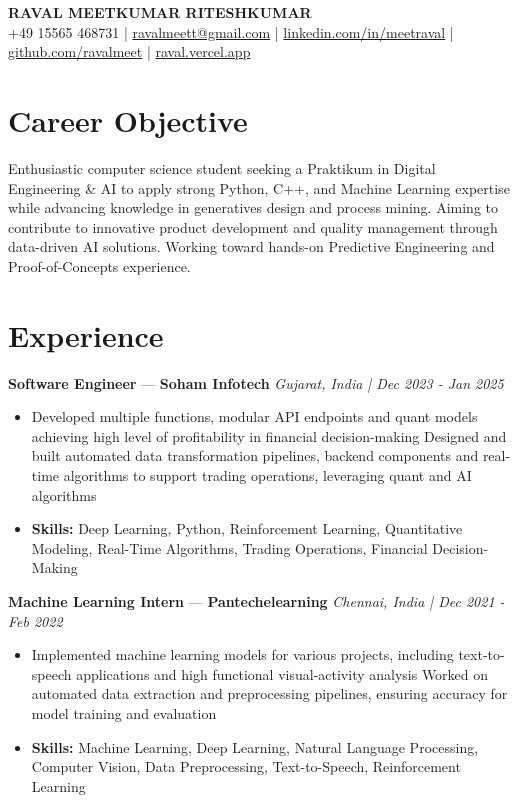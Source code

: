 \documentclass[a4paper,10pt]{article}
\begin{document}
\begin{center}
  {\Large\bfseries RAVAL MEETKUMAR RITESHKUMAR}\\[2pt]
  {\small +49 15565 468731 \;|\; \href{mailto:ravalmeett@gmail.com}{ravalmeett@gmail.com} \;|\; \href{https://www.linkedin.com/in/meetraval/}{linkedin.com/in/meetraval} \;|\; \href{https://github.com/ravalmeet}{github.com/ravalmeet} \;|\; \href{https://raval.vercel.app/}{raval.vercel.app}}
\end{center}
\vspace{-3pt}

\section*{Career Objective}
Enthusiastic computer science student seeking a Praktikum in Digital Engineering \& AI to apply strong Python, C++, and Machine Learning expertise while advancing knowledge in generatives design and process mining. Aiming to contribute to innovative product development and quality management through data-driven AI solutions. Working toward hands-on Predictive Engineering and Proof-of-Concepts experience.\par

\section*{Experience}
\textbf{Software Engineer} — \textbf{Soham Infotech} \hfill \textit{Gujarat, India \;|\; Dec 2023 - Jan 2025}\par
\vspace{1pt}
\begin{itemize}
  \item Developed multiple functions, modular API endpoints and quant models achieving high level of profitability in financial decision-making Designed and built automated data transformation pipelines, backend components and real-time algorithms to support trading operations, leveraging quant and AI algorithms
  \item \textbf{Skills:} Deep Learning, Python, Reinforcement Learning, Quantitative Modeling, Real-Time Algorithms, Trading Operations, Financial Decision-Making
\end{itemize}
\vspace{3pt}
\textbf{Machine Learning Intern} — \textbf{Pantechelearning} \hfill \textit{Chennai, India \;|\; Dec 2021 - Feb 2022}\par
\vspace{1pt}
\begin{itemize}
  \item Implemented machine learning models for various projects, including text-to-speech applications and high functional visual-activity analysis Worked on automated data extraction and preprocessing pipelines, ensuring accuracy for model training and evaluation
  \item \textbf{Skills:} Machine Learning, Deep Learning, Natural Language Processing, Computer Vision, Data Preprocessing, Text-to-Speech, Reinforcement Learning
\end{itemize}
\end{document}
